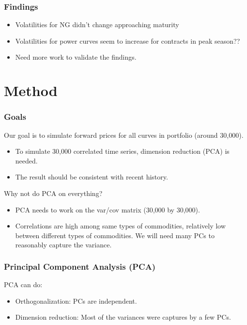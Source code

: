 \documentclass[10pt]{beamer}
\begin{document}
\frame
{
  \frametitle{Findings}
\begin{itemize}
\item Volatilities for NG didn't change approaching maturity
\item Volatilities for power curves seem to increase 
for contracts in peak season??
\item Need more work to validate the findings.
\end{itemize}
}





\section{Method}

\frame
{
  \frametitle{Goals}
Our goal is to simulate forward prices for all curves in portfolio
(around 30,000).
\begin{itemize}
\item To simulate 30,000 correlated time series, dimension 
reduction (PCA) is needed. 
\item The result should be consistent with recent history.
\end{itemize}

\vspace{10pt}
Why not do PCA on everything? 
\begin{itemize}
\item PCA needs to work on the var/cov matrix (30,000 by 30,000).
\item Correlations are high among same types of commodities, 
relatively low between different types of commodities.
We will need many PCs to reasonably capture the variance.
\end{itemize}
}



\frame
{
  \frametitle{Principal Component Analysis (PCA)}
PCA can do:
\begin{itemize}
\item Orthogonalization: PCs are independent.
\item Dimension reduction: Most of the variances were captures by  a few PCs.
\end{itemize}

}
\end{document}
